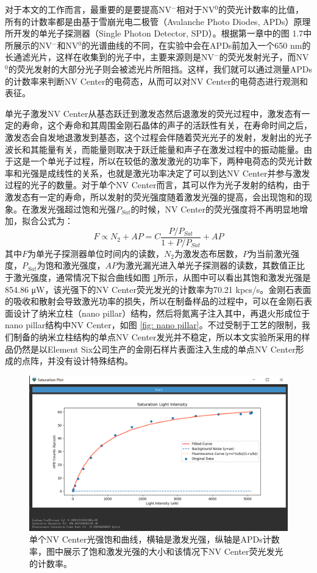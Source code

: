 \documentclass[type = bachelor]{whu-thesis}
\begin{document}
对于本文的工作而言，最重要的是要提高NV$^-$相对于NV$^0$的荧光计数率的比值，所有的计数率都是由基于雪崩光电二极管（Avalanche Photo Diodes, APDs）原理所开发的单光子探测器（Single Photon Detector, SPD）。根据第一章中的图 1.7中所展示的NV$^-$和NV$^0$的光谱曲线的不同，在实验中会在APDs前加入一个650 nm的长通滤光片，这样在收集到的光子中，主要来源则是NV$^-$的荧光发射光子，而NV$^0$的荧光发射的大部分光子则会被滤光片所阻挡。这样，我们就可以通过测量APDs的计数率来判断NV Center的电荷态，从而可以对NV Center的电荷态进行观测和表征。

单光子激发NV Center从基态跃迁到激发态然后退激发的荧光过程中，激发态有一定的寿命，这个寿命和其周围金刚石晶体的声子的活跃性有关，在寿命时间之后，激发态会自发地退激发到基态，这个过程会伴随着荧光光子的发射，发射出的光子波长和其能量有关，而能量则取决于跃迁能量和声子在激发过程中的振动能量。由于这是一个单光子过程，所以在较低的激发激光的功率下，两种电荷态的荧光计数率和光强是成线性的关系，也就是激光功率决定了可以到达NV Center并参与激发过程的光子的数量\cite{aslam2013photo}。对于单个NV Center而言，其可以作为光子发射的结构，由于激发态有一定的寿命，所以发射的荧光强度随着激发光强的提高，会出现饱和的现象。在激发光强超过饱和光强$P_{Sat}$的时候，NV Center的荧光强度将不再明显地增加，拟合公式为：
\begin{equation}
  F \propto N_2 +AP = C \frac{P/P_{Sat}}{1+P/P_{Sat}}+AP
\end{equation} 
其中$F$为单光子探测器单位时间内的读数，$N_2$为激发态布居数，$P$为当前激光强度，$P_{Sat}$为饱和激光强度，$AP$为激光漏光进入单光子探测器的读数，其数值正比于激光强度，通常情况下拟合曲线如图 \ref{fig: Saturation Plot}所示，从图中可以看出其饱和激发光强是854.86 \unit{\uW}，该光强下的NV Center荧光发光的计数率为70.21 kpcs/s。金刚石表面的吸收和散射会导致激光功率的损失，所以在制备样品的过程中，可以在金刚石表面设计了纳米立柱（nano pillar）结构，然后将氮离子注入其中，再退火形成位于nano pillar结构中NV Center，如图 \ref{fig: nano pillar}。不过受制于工艺的限制，我们制备的纳米立柱结构的单点NV Center发光并不稳定，所以本文实验所采用的样品仍然是以Element Six公司生产的金刚石样片表面注入生成的单点NV Center形成的点阵，并没有设计特殊结构。

\begin{figure}
  \centering
  \includegraphics[width=1.0\textwidth]{figures/Chapter 2/Saturation Plot.png}
  \caption[单个NV Center光强饱和曲线]{单个NV Center光强饱和曲线，横轴是激发光强，纵轴是APDs计数率，图中展示了饱和激发光强的大小和该情况下NV Center荧光发光的计数率。}
  \label{fig: Saturation Plot}
\end{figure}
\end{document}
